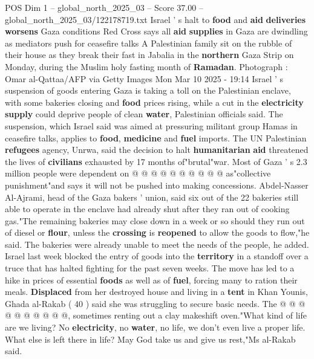 \begin{textsample}{POS Dim 1 – global\_north\_2025\_03 – Score 37.00 – global\_north\_2025\_03/122178719.txt}  \label{ex:f1_pos_391}
Israel ' s halt to \textbf{food} and \textbf{aid} \textbf{deliveries} \textbf{worsens} Gaza conditions Red Cross says all \textbf{aid} \textbf{supplies} in Gaza are dwindling as mediators push for ceasefire talks A Palestinian family sit on the rubble of their house as they break their fast in Jabalia in the \textbf{northern} Gaza Strip on Monday, during the Muslim holy fasting month of \textbf{Ramadan}.
Photograph : Omar al-Qattaa/AFP via Getty Images Mon Mar 10 2025 - 19:14 Israel ' s suspension of goods entering Gaza is taking a toll on the Palestinian enclave, with some bakeries closing and \textbf{food} prices rising, while a cut in the \textbf{electricity} \textbf{supply} could deprive people of clean \textbf{water}, Palestinian officials said.
The suspension, which Israel said was aimed at pressuring militant group Hamas in ceasefire talks, applies to \textbf{food}, \textbf{medicine} and \textbf{fuel} imports.
The UN Palestinian \textbf{refugees} agency, Unrwa, said the decision to halt \textbf{humanitarian} \textbf{aid} threatened the lives of \textbf{civilians} exhausted by 17 months of"brutal"war.
Most of Gaza ' s 2.3 million people were dependent on @ @ @ @ @ @ @ @ @ @ as"collective punishment"and says it will not be pushed into making concessions.
Abdel-Nasser Al-Ajrami, head of the Gaza bakers ' union, said six out of the 22 bakeries still able to operate in the enclave had already shut after they ran out of cooking gas."The remaining bakeries may close down in a week or so should they run out of diesel or \textbf{flour}, unless the \textbf{crossing} is \textbf{reopened} to allow the goods to flow,"he said.
The bakeries were already unable to meet the needs of the people, he added.
Israel last week blocked the entry of goods into the \textbf{territory} in a standoff over a truce that has halted fighting for the past seven weeks.
The move has led to a hike in prices of essential \textbf{foods} as well as of \textbf{fuel}, forcing many to ration their meals. \textbf{Displaced} from her destroyed house and living in a \textbf{tent} in Khan Younis, Ghada al-Rakab ( 40 ) said she was struggling to secure basic needs.
The @ @ @ @ @ @ @ @ @ @, sometimes renting out a clay makeshift oven."What kind of life are we living?
No \textbf{electricity}, no \textbf{water}, no life, we don't even live a proper life.
What else is left there in life?
May God take us and give us rest,"Ms al-Rakab said.

\end{textsample}

